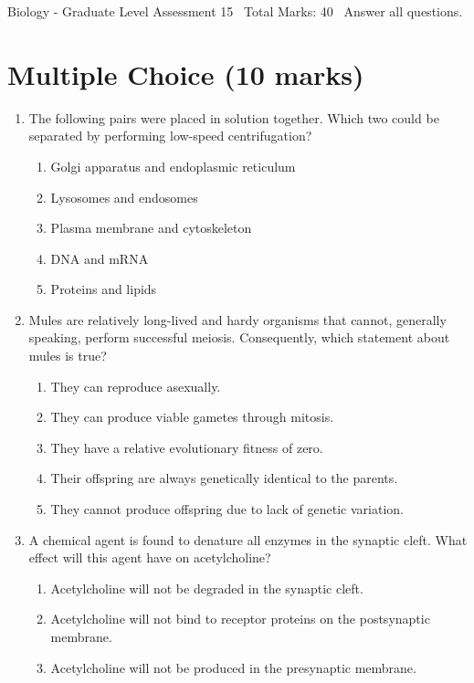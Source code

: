\documentclass[12pt]{article}
\begin{document}
\begin{center}
Biology - Graduate Level Assessment 15 \
Total Marks: 40 \
Answer all questions.
\end{center}

\section*{Multiple Choice (10 marks)}
\begin{enumerate}[label=\arabic*.]
\item The following pairs were placed in solution together. Which two could be separated by performing low-speed centrifugation?
\begin{enumerate}[label=(\alph*)]
    \item Golgi apparatus and endoplasmic reticulum
    \item Lysosomes and endosomes
    \item Plasma membrane and cytoskeleton
    \item DNA and mRNA
    \item Proteins and lipids
\end{enumerate}
\item Mules are relatively long-lived and hardy organisms that cannot, generally speaking, perform successful meiosis. Consequently, which statement about mules is true?
\begin{enumerate}[label=(\alph*)]
    \item They can reproduce asexually.
    \item They can produce viable gametes through mitosis.
    \item They have a relative evolutionary fitness of zero.
    \item Their offspring are always genetically identical to the parents.
    \item They cannot produce offspring due to lack of genetic variation.
\end{enumerate}
\item A chemical agent is found to denature all enzymes in the synaptic cleft. What effect will this agent have on acetylcholine?
\begin{enumerate}[label=(\alph*)]
    \item Acetylcholine will not be degraded in the synaptic cleft.
    \item Acetylcholine will not bind to receptor proteins on the postsynaptic membrane.
    \item Acetylcholine will not be produced in the presynaptic membrane.

\end{enumerate}
\end{enumerate}
\end{document}
